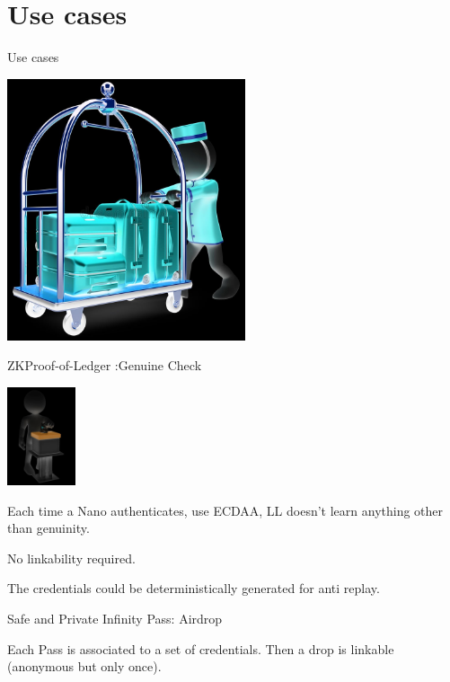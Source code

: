 \documentclass[aspectratio=43]{beamer}
\begin{document}
\section{Use cases}

\begin{frame}{Use cases}
\begin{center}
\includegraphics[width=7cm]{images/usecases.jpg}
\end{center}


\end{frame}


\begin{frame}{ZKProof-of-Ledger :Genuine Check}

\begin{center}
\includegraphics[width=2cm]{images/vote.jpg}
\end{center}

Each time a Nano authenticates, use ECDAA, LL doesn't learn anything other than genuinity.

No linkability required.

The credentials could be deterministically generated for anti replay.

\end{frame}

\begin{frame}{Safe and Private Infinity Pass: Airdrop}


Each Pass is associated to a set of credentials. Then a drop is linkable (anonymous but only once).


\end{frame}
\end{document}
